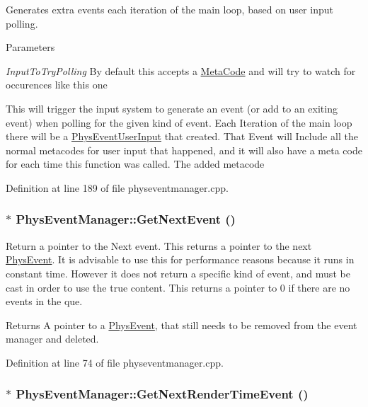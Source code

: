 Generates extra events each iteration of the main loop, based on user input polling. 
\begin{DoxyParams}{Parameters}
\item[{\em InputToTryPolling}]By default this accepts a \hyperlink{classMetaCode}{MetaCode} and will try to watch for occurences like this one\end{DoxyParams}
This will trigger the input system to generate an event (or add to an exiting event) when polling for the given kind of event. Each Iteration of the main loop there will be a \hyperlink{classPhysEventUserInput}{PhysEventUserInput} that created. That Event will Include all the normal metacodes for user input that happened, and it will also have a meta code for each time this function was called. The added metacode 

Definition at line 189 of file physeventmanager.cpp.\hypertarget{classPhysEventManager_a6de94bc6c23dcbd7e15785cadee2e80b}{
\subsubsection[{GetNextEvent}]{ $\ast$ PhysEventManager::GetNextEvent ()}}
\label{d5/dd7/classPhysEventManager_a6de94bc6c23dcbd7e15785cadee2e80b}


Return a pointer to the Next event. This returns a pointer to the next \hyperlink{classPhysEvent}{PhysEvent}. It is advisable to use this for performance reasons because it runs in constant time. However it does not return a specific kind of event, and must be cast in order to use the true content. This returns a pointer to 0 if there are no events in the que. \begin{DoxyReturn}{Returns}
A pointer to a \hyperlink{classPhysEvent}{PhysEvent}, that still needs to be removed from the event manager and deleted. 
\end{DoxyReturn}


Definition at line 74 of file physeventmanager.cpp.\hypertarget{classPhysEventManager_a1f2d0506ce816176913e5bdfaa9fd724}{
\subsubsection[{GetNextRenderTimeEvent}]{ $\ast$ PhysEventManager::GetNextRenderTimeEvent ()}}
\label{d5/dd7/classPhysEventManager_a1f2d0506ce816176913e5bdfaa9fd724}


